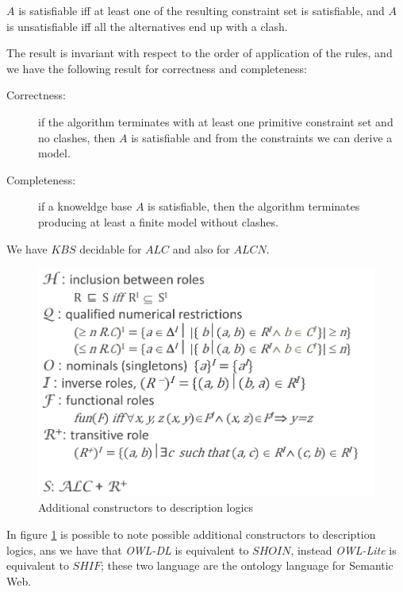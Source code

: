 $A$ is satisfiable iff at least one of the resulting constraint set is satisfiable, and 
$A$ is unsatisfiable iff all the alternatives end up with a clash.

The result is invariant with respect to the order of application of the rules, and we have
the following result for correctness and completeness:
\begin{description}
   \item [Correctness: ] if the algorithm terminates with at least one primitive constraint
	   set and no clashes, then $A$ is satisfiable and from the constraints
           we can derive a model.
   \item [Completeness: ] if a knoweldge base $A$ is satisfiable, then the algorithm
                          terminates producing at least a finite model without clashes.
\end{description}
We have $KBS$ decidable for $ALC$ and also for $ALCN$.

\begin{figure}
	\includegraphics[width=\textwidth]{Images/addConstructors}
	\caption{Additional constructors to description logics}
	\label{img:addConstructors}
\end{figure}
In figure \ref{img:addConstructors} is possible to note possible additional constructors to
description logics, ans we have that \emph{OWL-DL} is equivalent to $SHOIN$, instead
\emph{OWL-Lite} is equivalent to $SHIF$; these two language are the ontology language
for Semantic Web.

